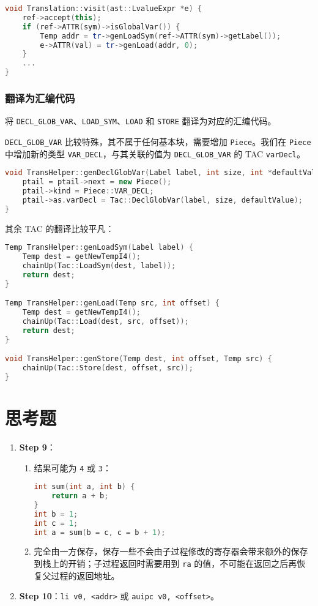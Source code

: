 \documentclass[a4paper]{article}
\begin{document}
\begin{lstlisting}[language=c++]
void Translation::visit(ast::LvalueExpr *e) {
    ref->accept(this);
    if (ref->ATTR(sym)->isGlobalVar()) {
        Temp addr = tr->genLoadSym(ref->ATTR(sym)->getLabel());
        e->ATTR(val) = tr->genLoad(addr, 0);
    }
    ...
}
\end{lstlisting}

\subsubsection{翻译为汇编代码}

将 \texttt{DECL\_GLOB\_VAR}、\texttt{LOAD\_SYM}、\texttt{LOAD} 和 \texttt{STORE} 翻译为对应的汇编代码。

\texttt{DECL\_GLOB\_VAR} 比较特殊，其不属于任何基本块，需要增加 \texttt{Piece}。我们在 \texttt{Piece} 中增加新的类型 \texttt{VAR\_DECL}，与其关联的值为 \texttt{DECL\_GLOB\_VAR} 的 TAC \texttt{varDecl}。

\begin{lstlisting}[language=c++]
void TransHelper::genDeclGlobVar(Label label, int size, int *defaultValue) {
    ptail = ptail->next = new Piece();
    ptail->kind = Piece::VAR_DECL;
    ptail->as.varDecl = Tac::DeclGlobVar(label, size, defaultValue);
}
\end{lstlisting}

其余 TAC 的翻译比较平凡：

\begin{lstlisting}[language=c++]
Temp TransHelper::genLoadSym(Label label) {
    Temp dest = getNewTempI4();
    chainUp(Tac::LoadSym(dest, label));
    return dest;
}

Temp TransHelper::genLoad(Temp src, int offset) {
    Temp dest = getNewTempI4();
    chainUp(Tac::Load(dest, src, offset));
    return dest;
}

void TransHelper::genStore(Temp dest, int offset, Temp src) {
    chainUp(Tac::Store(dest, offset, src));
}
\end{lstlisting}

\section{思考题}

\begin{enumerate}
    \item \textbf{Step 9}：\begin{enumerate}
              \item 结果可能为 \texttt{4} 或 \texttt{3}：\begin{lstlisting}[language=c]
int sum(int a, int b) {
    return a + b;
}
int b = 1;
int c = 1;
int a = sum(b = c, c = b + 1);
            \end{lstlisting}
              \item 完全由一方保存，保存一些不会由子过程修改的寄存器会带来额外的保存到栈上的开销；子过程返回时需要用到 \texttt{ra} 的值，不可能在返回之后再恢复父过程的返回地址。
          \end{enumerate}
    \item \textbf{Step 10}：\texttt{li v0, <addr>} 或 \texttt{auipc v0, <offset>}。
\end{enumerate}
\end{document}
